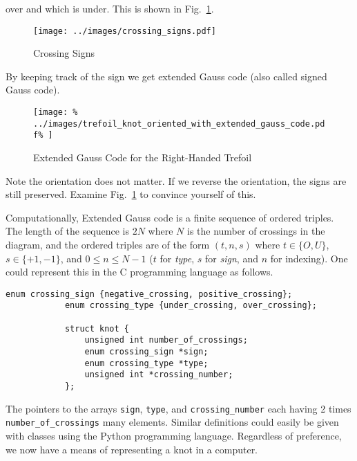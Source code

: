 \documentclass{article}
\theoremstyle{plain}
\begin{document}
        over and which is under. This is shown in Fig.~\ref{fig:crossing_signs}.
        \begin{figure}
            \centering
            \texttt{[image: ../images/crossing\_signs.pdf]}
            \caption{Crossing Signs}
            \label{fig:crossing_signs}
        \end{figure}
        By keeping track of the sign we get extended Gauss code
        (also called signed Gauss code).
        \begin{figure}
            \centering
            \texttt{[image: \%
                ../images/trefoil\_knot\_oriented\_with\_extended\_gauss\_code.pdf\%
            ]}
            \caption{Extended Gauss Code for the Right-Handed Trefoil}
            \label{fig:right_hand_trefoil_extended_gauss}
        \end{figure}
        Note the orientation does not matter. If we reverse the orientation,
        the signs are still preserved. Examine Fig.~\ref{fig:crossing_signs} to
        convince yourself of this.
        \par\hfill\par
        Computationally, Extended Gauss code is a finite sequence of ordered
        triples. The length of the sequence is $2N$ where $N$ is the number of
        crossings in the diagram, and the ordered triples are of the form
        $(t,n,s)$ where $t\in\{O,U\}$, $s\in\{+1,-1\}$, and
        $0\leq{n}\leq{N-1}$ ($t$ for \textit{type}, $s$ for \textit{sign}, and
        $n$ for indexing). One could represent this in the C programming
        language as follows.
        \begin{lstlisting}[style=CStyle, gobble=12]
            enum crossing_sign {negative_crossing, positive_crossing};
            enum crossing_type {under_crossing, over_crossing};

            struct knot {
                unsigned int number_of_crossings;
                enum crossing_sign *sign;
                enum crossing_type *type;
                unsigned int *crossing_number;
            };
        \end{lstlisting}
        The pointers to the arrays \texttt{sign}, \texttt{type}, and
        \texttt{crossing\_number} each having 2 times
        \texttt{number\_of\_crossings} many elements.
        Similar definitions could easily be given with classes using the
        Python programming language. Regardless of preference, we now have a
        means of representing a knot in a computer.
\end{document}
